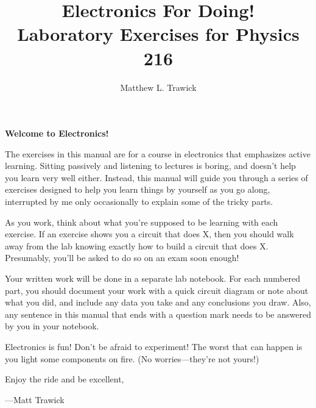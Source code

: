 \title{Electronics For Doing!\\
Laboratory Exercises for Physics 216}

\author{Matthew L. Trawick}

\maketitle

\vspace{0.4 in}


\begin{center}
\large{\textbf{Welcome to Electronics!}}
\end{center}

The exercises in this manual are for a course in electronics that emphasizes active learning. 
Sitting passively and listening to lectures is boring, and doesn't help you learn very well either.
Instead, this manual will guide you through a series of exercises designed to help you learn things by yourself as you go along, interrupted by me only occasionally to explain some of the tricky parts.

As you work, think about what you're supposed to be learning with each exercise.  If an exercise shows you a circuit that does X, then you should walk away from the lab knowing exactly how to build a circuit that does X.  Presumably, you'll be asked to do so on an exam soon enough!

Your written work will be done in a separate lab notebook.  For each numbered part, you should document your work with a quick circuit diagram or note about what you did, and include any data you take and any conclusions you draw.  Also, any sentence in this manual that ends with a question mark needs to be answered by you in your notebook.

Electronics is fun!  Don't be afraid to experiment!  The worst that can happen is you light some components on fire.  (No worries---they're not yours!)

Enjoy the ride and be excellent,

---Matt Trawick


\newpage
\
\thispagestyle{plain}

\newpage
\


